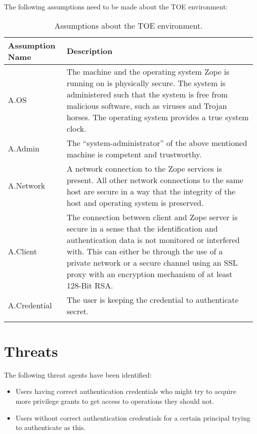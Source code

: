 \documentclass[12pt,english]{scrbook}
\begin{document}
The following assumptions need to be made about the TOE environment:

\begin{longtable}[c]{lp{10cm}}
  \toprule
  Assumption Name & Description \\
  \midrule

  A.OS & The machine and the operating system Zope is running on is physically
  secure. The system is administered such that the system is free from
  malicious software, such as viruses and Trojan horses. The operating system
  provides a true system clock. \\

  A.Admin & 
  The ``system-administrator'' of the above
  mentioned machine is competent and trustworthy.
   \\

  A.Network & 
  A network connection to the Zope services is
  present. All other network connections to the same host are
  secure in a way that the integrity of
  the host and operating system is preserved.
   \\

  A.Client & 
  The connection between client and Zope server is
  secure in a sense that the identification and
  authentication data is not monitored or interfered with. This can either be
  through the use of a private network or a secure channel using an SSL proxy
  with an encryption mechanism of at least 128-Bit RSA.
  \\

  A.Credential & 
  The user is keeping the credential to authenticate
  secret. \\

  \bottomrule
  \caption{Assumptions about the TOE environment.}
  \label{tab-A}
\end{longtable}




\section{Threats}

The following threat agents have been identified:

\begin{itemize} 

  \item Users having correct authentication credentials who might try to
  acquire more privilege grants to get access to operations they should not.

  \item Users without correct authentication credentials for a certain
  principal trying to authenticate as this.

\end{itemize}
\end{document}
